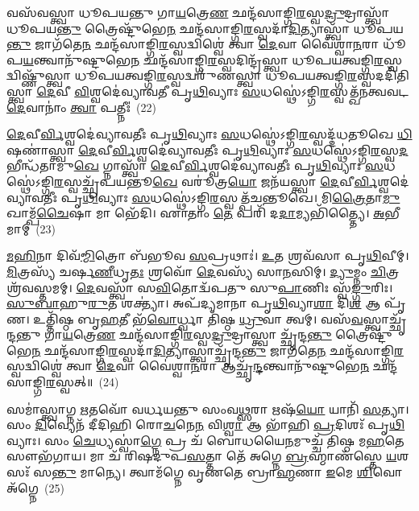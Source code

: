 {\anuvakamend[{\-\ul{𑌮𑌿}\-𑌤𑍍𑌰𑌃 𑌕᳴𑌰𑍋\-\ul{𑌤𑍍𑌵}\-𑌨𑍍𑌤𑌰𑌿᳴𑌕𑍍𑌷𑌮\-\ul{𑌸𑌿} 𑌪𑍍𑌰 \ul{𑌚}\-𑌤𑍍𑌵𑌾𑌰𑌿᳴ 𑌚}]}%

𑌵𑌸᳴𑌵𑌸𑍍𑌤𑍍𑌵𑌾 𑌧𑍂𑌪𑌯𑌨𑍍𑌤𑍁 𑌗𑌾\-\ul{𑌯}\-𑌤𑍍𑌰𑍇\-\ul{𑌣} 𑌛𑌨𑍍𑌦᳴𑌸𑌾𑌙𑍍𑌗𑌿\-\ul{𑌰}\-𑌸𑍍𑌵\-\ul{𑌦𑍍𑌰𑍁}\-𑌦𑍍𑌰𑌾𑌸𑍍𑌤𑍍𑌵𑌾᳴ 𑌧𑍂𑌪𑌯\-\ul{𑌨𑍍𑌤𑍁} 𑌤𑍍𑌰𑍈𑌷𑍍𑌟𑍁᳴𑌭𑍇\-\ul{𑌨} 𑌛𑌨𑍍𑌦᳴𑌸𑌾𑌙𑍍𑌗𑌿\-\ul{𑌰}\-𑌸𑍍𑌵𑌦𑌾᳴\-\ul{𑌦𑌿}\-𑌤𑍍𑌯𑌾𑌸𑍍𑌤𑍍𑌵𑌾᳴ 𑌧𑍂𑌪𑌯\-\ul{𑌨𑍍𑌤𑍁} 𑌜𑌾𑌗᳴𑌤𑍇\-\ul{𑌨} 𑌛𑌨𑍍𑌦᳴𑌸𑌾𑌙𑍍𑌗𑌿\-\ul{𑌰}\-𑌸𑍍𑌵𑌦𑍍𑌵𑌿𑌶𑍍𑌵𑍇॑ 𑌤𑍍𑌵𑌾 \ul{𑌦𑍇}\-𑌵𑌾 𑌵𑍈॑𑌶𑍍𑌵𑌾\-\ul{𑌨}\-𑌰𑌾 𑌧𑍂᳴𑌪\-\ul{𑌯}\-𑌨𑍍𑌤𑍍𑌵𑌾𑌨𑍁᳴𑌷𑍍𑌟𑍁𑌭𑍇\-\ul{𑌨} 𑌛𑌨𑍍𑌦᳴𑌸𑌾𑌙𑍍𑌗𑌿\-\ul{𑌰}\-𑌸𑍍𑌵𑌦𑌿𑌨𑍍𑌦𑍍𑌰᳴𑌸𑍍𑌤𑍍𑌵𑌾 𑌧𑍂𑌪𑌯𑌤𑍍𑌵𑌙𑍍𑌗𑌿\-\ul{𑌰}\-𑌸𑍍𑌵𑌦𑍍𑌵𑌿𑌷𑍍𑌣𑍁᳴𑌸𑍍𑌤𑍍𑌵𑌾 𑌧𑍂𑌪𑌯𑌤𑍍𑌵𑌙𑍍𑌗𑌿\-\ul{𑌰}\-𑌸𑍍𑌵𑌦𑍍𑌵𑌰𑍁᳴𑌣𑌸𑍍𑌤𑍍𑌵𑌾 𑌧𑍂𑌪𑌯𑌤𑍍𑌵𑌙𑍍𑌗𑌿\-\ul{𑌰}\-𑌸𑍍𑌵𑌦𑌦𑌿᳴𑌤𑌿𑌸𑍍𑌤𑍍𑌵𑌾 \ul{𑌦𑍇}\-𑌵𑍀 \ul{𑌵𑌿}\-𑌶𑍍𑌵𑌦𑍇॑𑌵𑍍𑌯𑌾𑌵𑌤𑍀 𑌪𑍃\-\ul{𑌥𑌿}\-𑌵𑍍𑌯𑌾𑌃 \ul{𑌸}\-𑌧𑌸𑍍𑌥𑍇॑\-𑌽𑌙𑍍𑌗𑌿\-\ul{𑌰}\-𑌸𑍍𑌵𑌤𑍍𑌖᳴𑌨𑌤𑍍𑌵𑌵𑌟 \ul{𑌦𑍇}\-𑌵𑌾𑌨𑌾𑌂॑ \ul{𑌤𑍍𑌵𑌾} 𑌪𑌤𑍍𑌨𑍀𑌃॑~(22)

\-\ul{𑌦𑍇}\-𑌵𑍀\-\ul{𑌰𑍍𑌵𑌿}\-𑌶𑍍𑌵𑌦𑍇॑𑌵𑍍𑌯𑌾𑌵𑌤𑍀𑌃 𑌪𑍃\-\ul{𑌥𑌿}\-𑌵𑍍𑌯𑌾𑌃 \ul{𑌸}\-𑌧𑌸𑍍𑌥𑍇॑\-𑌽𑌙𑍍𑌗𑌿\-\ul{𑌰}\-𑌸𑍍𑌵𑌦𑍍𑌦᳴𑌧𑌤𑍂𑌖𑍇 \ul{𑌧𑌿}\-𑌷𑌣𑌾॑𑌸𑍍𑌤𑍍𑌵𑌾 \ul{𑌦𑍇}\-𑌵𑍀\-\ul{𑌰𑍍𑌵𑌿}\-𑌶𑍍𑌵𑌦𑍇॑𑌵𑍍𑌯𑌾𑌵𑌤𑍀𑌃 𑌪𑍃\-\ul{𑌥𑌿}\-𑌵𑍍𑌯𑌾𑌃 \ul{𑌸}\-𑌧𑌸𑍍𑌥𑍇॑\-𑌽𑌙𑍍𑌗𑌿\-\ul{𑌰}\-𑌸𑍍𑌵\-\ul{𑌦}\-𑌭𑍀𑌨𑍍𑌧᳴𑌤𑌾𑌮𑍁\-\ul{𑌖𑍇} 𑌗𑍍𑌨𑌾𑌸𑍍𑌤𑍍𑌵𑌾᳴ \ul{𑌦𑍇}\-𑌵𑍀\-\ul{𑌰𑍍𑌵𑌿}\-𑌶𑍍𑌵𑌦𑍇॑𑌵𑍍𑌯𑌾𑌵𑌤𑍀𑌃 𑌪𑍃\-\ul{𑌥𑌿}\-𑌵𑍍𑌯𑌾𑌃 \ul{𑌸}\-𑌧𑌸𑍍𑌥𑍇॑\-𑌽𑌙𑍍𑌗𑌿\-\ul{𑌰}\-𑌸𑍍𑌵𑌚𑍍𑌛𑍍𑌰᳴𑌪𑌯𑌨𑍍𑌤𑍂\-\ul{𑌖𑍇} 𑌵𑌰𑍂॑𑌤𑍍𑌰\-\ul{𑌯𑍋} 𑌜𑌨᳴𑌯𑌸𑍍𑌤𑍍𑌵𑌾 \ul{𑌦𑍇}\-𑌵𑍀\-\ul{𑌰𑍍𑌵𑌿}\-𑌶𑍍𑌵𑌦𑍇॑𑌵𑍍𑌯𑌾𑌵𑌤𑍀𑌃 𑌪𑍃\-\ul{𑌥𑌿}\-𑌵𑍍𑌯𑌾𑌃 \ul{𑌸}\-𑌧𑌸𑍍𑌥𑍇॑\-𑌽𑌙𑍍𑌗𑌿\-\ul{𑌰}\-𑌸𑍍𑌵𑌤𑍍𑌪᳴𑌚𑌨𑍍𑌤𑍂𑌖𑍇। 𑌮𑌿\-\ul{𑌤𑍍𑌰𑍈}\-𑌤𑌾\-\ul{𑌮𑍁}\-𑌖𑌾𑌮𑍍𑌪᳴\-\ul{𑌚𑍈}\-𑌷𑌾 𑌮𑌾 𑌭𑍇᳴𑌦𑌿। 𑌏𑌾𑌤𑌾𑌂 \ul{𑌤𑍇} 𑌪𑌰𑌿᳴ 𑌦\-\ul{𑌦𑌾}\-𑌮𑍍𑌯𑌭𑌿᳴𑌤𑍍𑌤𑍍𑌯𑍈। \ul{𑌅}\-𑌭𑍀𑌮𑌾𑌮𑍍~(23)

\-\ul{𑌮}\-\-\ul{𑌹𑌿}\-𑌨𑌾 𑌦𑌿𑌵᳴\-\ul{𑌮𑍍𑌮𑌿}\-𑌤𑍍𑌰𑍋 𑌬᳴𑌭𑍂𑌵 \ul{𑌸}\-𑌪𑍍𑌰𑌥𑌾𑌃॑। \ul{𑌉}\-𑌤 𑌶𑍍𑌰𑌵᳴𑌸𑌾 𑌪𑍃\-\ul{𑌥𑌿}\-𑌵𑍀𑌮𑍍। \ul{𑌮𑌿}\-𑌤𑍍𑌰𑌸𑍍𑌯᳴ 𑌚𑌰𑍍\mbox{}𑌷\-\ul{𑌣𑍀}\-𑌧𑍃\-\ul{𑌤𑌃} 𑌶𑍍𑌰𑌵𑍋᳴ \ul{𑌦𑍇}\-𑌵𑌸𑍍𑌯᳴ 𑌸𑌾\-\ul{𑌨}\-𑌸𑌿𑌮𑍍। \ul{𑌦𑍍𑌯𑍁}\-𑌮𑍍𑌨𑌂 \ul{𑌚𑌿}\-𑌤𑍍𑌰𑌶𑍍𑌰᳴𑌵𑌸𑍍𑌤𑌮𑌮𑍍। \ul{𑌦𑍇}\-𑌵𑌸𑍍𑌤𑍍𑌵𑌾᳴ 𑌸\-\ul{𑌵𑌿}\-𑌤𑍋𑌦𑍍𑌵᳴𑌪𑌤𑍁 𑌸𑍁\-\ul{𑌪𑌾}\-𑌣𑌿𑌃 𑌸𑍍𑌵᳴\-\ul{𑌙𑍍𑌗𑍁}\-॒𑌰𑌿𑌃। \ul{𑌸𑍁}\-\-\ul{𑌬𑌾}\-𑌹𑍁\-\ul{𑌰𑍁}\-𑌤 𑌶𑌕𑍍𑌤𑍍𑌯𑌾॑। 𑌅𑌪᳴𑌦𑍍𑌯𑌮𑌾𑌨𑌾 𑌪𑍃\-\ul{𑌥𑌿}\-𑌵𑍍𑌯𑌾\-\ul{𑌶𑌾} 𑌦𑌿\-\ul{𑌶} 𑌆 𑌪𑍃᳴𑌣। 𑌉𑌤𑍍𑌤𑌿᳴𑌷𑍍𑌠 𑌬𑍃\-\ul{𑌹}\-𑌤𑍀 𑌭᳴\-\ul{𑌵𑍋}\-𑌰𑍍𑌧𑍍𑌵𑌾 𑌤𑌿᳴𑌷𑍍𑌠 \ul{𑌧𑍍𑌰𑍁}\-𑌵𑌾 𑌤𑍍𑌵𑌮𑍍। 𑌵𑌸᳴\-\ul{𑌵}\-𑌸𑍍𑌤𑍍𑌵𑌾𑌚𑍍𑌛𑍃᳴𑌨𑍍𑌦𑌨𑍍𑌤𑍁 𑌗𑌾\-\ul{𑌯}\-𑌤𑍍𑌰𑍇\-\ul{𑌣} 𑌛𑌨𑍍𑌦᳴𑌸𑌾𑌙𑍍𑌗𑌿\-\ul{𑌰}\-𑌸𑍍𑌵\-\ul{𑌦𑍍𑌰𑍁}\-𑌦𑍍𑌰𑌾𑌸𑍍𑌤𑍍𑌵𑌾 𑌚𑍍𑌛𑍃᳴𑌨𑍍𑌦\-\ul{𑌨𑍍𑌤𑍁} 𑌤𑍍𑌰𑍈𑌷𑍍𑌟𑍁᳴𑌭𑍇\-\ul{𑌨} 𑌛𑌨𑍍𑌦᳴𑌸𑌾𑌙𑍍𑌗𑌿\-\ul{𑌰}\-𑌸𑍍𑌵𑌦𑌾᳴\-\ul{𑌦𑌿}\-𑌤𑍍𑌯𑌾𑌸𑍍𑌤𑍍𑌵𑌾𑌚𑍍𑌛𑍃᳴𑌨𑍍𑌦\-\ul{𑌨𑍍𑌤𑍁} 𑌜𑌾𑌗᳴𑌤𑍇\-\ul{𑌨} 𑌛𑌨𑍍𑌦᳴𑌸𑌾𑌙𑍍𑌗𑌿\-\ul{𑌰}\-𑌸𑍍𑌵𑌦𑍍𑌵𑌿𑌶𑍍𑌵𑍇॑ 𑌤𑍍𑌵𑌾 \ul{𑌦𑍇}\-𑌵𑌾 𑌵𑍈॑𑌶𑍍𑌵𑌾\-\ul{𑌨}\-𑌰𑌾 𑌆𑌚𑍍𑌛𑍃᳴\-\ul{𑌨𑍍𑌦}\-𑌨𑍍𑌤𑍍𑌵𑌾𑌨𑍁᳴𑌷𑍍𑌟𑍁𑌭𑍇\-\ul{𑌨} 𑌛𑌨𑍍𑌦᳴𑌸𑌾𑌙𑍍𑌗𑌿\-\ul{𑌰}\-𑌸𑍍𑌵𑌤𑍍॥~(24)

{\anuvakamend[{𑌪𑌤𑍍𑌨𑍀᳴\-\ul{𑌰𑌿}\-𑌮𑌾𑍞 \ul{𑌰𑍁}\-𑌦𑍍𑌰𑌾𑌸𑍍𑌤𑍍𑌵𑌾𑌚𑍍𑌛𑍃᳴\-\ul{𑌨𑍍𑌦}\-𑌨𑍍𑌤𑍍𑌵𑍇\-\ul{𑌕𑌾}\-𑌨𑍍𑌨𑌵𑌿𑍞᳴\-\ul{𑌶}\-𑌤𑌿𑌶𑍍𑌚᳴}]}%

𑌸𑌮𑌾॑𑌸𑍍𑌤𑍍𑌵𑌾𑌗𑍍𑌨 \ul{𑌋}\-𑌤𑌵𑍋᳴ 𑌵𑌰𑍍𑌧𑌯𑌨𑍍𑌤𑍁 𑌸𑌂𑌵\-\ul{𑌥𑍍𑌸}\-𑌰𑌾 𑌋𑌷᳴\-\ul{𑌯𑍋} 𑌯𑌾𑌨𑌿᳴ \ul{𑌸}\-𑌤𑍍𑌯𑌾। 𑌸𑌂 \ul{𑌦𑌿}\-𑌵𑍍𑌯𑍇𑌨᳴ 𑌦𑍀𑌦𑌿𑌹𑌿 𑌰𑍋\-\ul{𑌚}\-𑌨𑍇\-\ul{𑌨} 𑌵𑌿\-\ul{𑌶𑍍𑌵𑌾} 𑌆 𑌭𑌾᳴𑌹𑌿 \ul{𑌪𑍍𑌰}\-𑌦𑌿𑌶𑌃᳴ 𑌪𑍃\-\ul{𑌥𑌿}\-𑌵𑍍𑌯𑌾𑌃। 𑌸𑌂 \ul{𑌚𑍇}\-𑌧𑍍𑌯𑌸𑍍𑌵𑌾॑\-\ul{𑌗𑍍𑌨𑍇} 𑌪𑍍𑌰 𑌚᳴ 𑌬𑍋𑌧𑌯𑍈\-\ul{𑌨}\-𑌮𑍁𑌚𑍍𑌚᳴ 𑌤𑌿𑌷𑍍𑌠 𑌮\-\ul{𑌹}\-𑌤𑍇 𑌸𑍗𑌭᳴𑌗𑌾𑌯। 𑌮𑌾 𑌚᳴ 𑌰𑌿𑌷𑌦𑍁𑌪\-\ul{𑌸}\-𑌤𑍍𑌤𑌾 𑌤𑍇᳴ 𑌅𑌗𑍍𑌨𑍇 \ul{𑌬𑍍𑌰}\-𑌹𑍍𑌮𑌾𑌣᳴𑌸𑍍𑌤𑍇 \ul{𑌯}\-𑌶𑌸𑌃᳴ 𑌸\-\ul{𑌨𑍍𑌤𑍁} 𑌮𑌾𑌨𑍍𑌯𑍇। 𑌤𑍍𑌵𑌾𑌮᳴𑌗𑍍𑌨𑍇 𑌵𑍃𑌣𑌤𑍇 𑌬𑍍𑌰𑌾\-\ul{𑌹𑍍𑌮}\-𑌣𑌾 \ul{𑌇}\-𑌮𑍇 \ul{𑌶𑌿}\-𑌵𑍋 𑌅᳴𑌗𑍍𑌨𑍇~(25)

